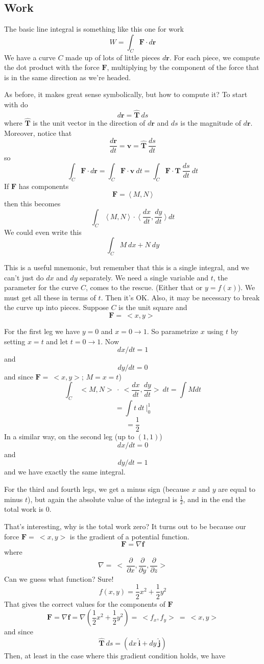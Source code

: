 \documentclass[11pt, oneside]{report}   	%
\begin{document}
\subsection*{Work}
The basic line integral is something like this one for work
\[ W = \int_C \mathbf{F} \cdot d\mathbf{r} \]
We have a curve $C$ made up of lots of little pieces $d\mathbf{r}$.  For each piece, we compute the dot product with the force $\mathbf{F}$, multiplying by the component of the force that is in the same direction as we're headed.  

As before, it makes great sense symbolically, but how to compute it?  To start with do
\[ d\mathbf{r} = \hat{\mathbf{T}} \ ds \]
where $\hat{\mathbf{T}}$ is the unit vector in the direction of $d\mathbf{r}$ and $ds$ is the magnitude of $d\mathbf{r}$.  Moreover, notice that
\[ \frac{d\mathbf{r}}{dt} = \mathbf{v} = \hat{\mathbf{T}} \ \frac{ds}{dt} \]
so
\[  \int_C \mathbf{F} \cdot d\mathbf{r} =  \int_C \mathbf{F} \cdot \mathbf{v} \ dt =  \int_C \mathbf{F} \cdot \mathbf{T}\ \frac{ds}{dt} \ dt  \]
If $\mathbf{F}$ has components
\[ \mathbf{F} = \ \langle \ M,N \ \rangle \]
then this becomes
\[  \int_C  \ \langle \ M,N \ \rangle \ \cdot \ \langle \ \frac{dx}{dt},\frac{dy}{dt} \ \rangle \ dt \]
We could even write this
\[  \int_C  M \ dx + N \ dy \]

This is a useful mnemonic, but remember that this is a single integral, and we can't just do $dx$ and $dy$ separately.  We need a single variable and $t$, the parameter for the curve $C$, comes to the rescue.  (Either that or $y=f(x)$).  We must get all these in terms of $t$.  Then it's OK.  Also, it may be necessary to break the curve up into pieces.
Suppose $C$ is the unit square and 
\[ \mathbf{F} = \ <x,y> \ \]

For the first leg we have $y=0$ and $x=0 \rightarrow 1$.  So parametrize $x$ using $t$ by setting $x=t$ and let $t=0 \rightarrow 1$.  Now
\[ dx/dt = 1 \] 
and 
\[ dy/dt=0 \]
 and since $\mathbf{F} = \ <x,y>$;  $M = x = t$)
 \[   \int_C  \ <M,N> \ \cdot \ <\frac{dx}{dt},\frac{dy}{dt}> \ dt = \int M dt \]
\[ = \int t \ dt \ \bigg|_0^1 \]
\[ = \frac{1}{2} \]
In a similar way, on the second leg (up to $(1,1)$)
\[ dx/dt=0 \]
 and 
 \[ dy/dt=1 \]
 and we have exactly the same integral.

For the third and fourth legs, we get a minus sign (because $x$ and $y$ are equal to minus $t$), but again the absolute value of the integral is $\frac{1}{2}$, and in the end the total work is 0.

That's interesting, why is the total work zero?  It turns out to be because our force $\mathbf{F} = \ <x,y>$ is the gradient of a potential function.  
\[ \mathbf{F} = \nabla \mathbf{f} \]
where
\[ \nabla = \ < \ \frac{\partial }{\partial  x},\frac{\partial }{\partial  y},\frac{\partial }{\partial  z} > \]
Can we guess what function? Sure!
\[ f(x,y) = \frac{1}{2}x^2 + \frac{1}{2}y^2 \]
That gives the correct values for the components of $\mathbf{F}$
\[ \mathbf{F} = \nabla \mathbf{f} = \nabla ( \frac{1}{2}x^2 + \frac{1}{2}y^2) = \ <f_x,f_y> \ = \ <x,y> \]
and since 
\[  \hat{\mathbf{T}} \ ds = (dx\ \hat{\mathbf{i}} + dy\ \hat{\mathbf{j}}) \]
Then, at least in the case where this gradient condition holds, we have
\end{document}
